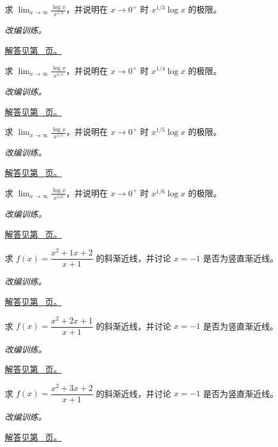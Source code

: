 \documentclass[12pt,fontset=fandol]{ctexart}
\begin{document}
\begin{example}[对数增长慢于正幂]\label{ex:c4q15}
求 $\displaystyle\lim_{x\to\infty}\frac{\log x}{x^{1/3}}$，并说明在 $x\to0^+$ 时 $x^{1/3}\log x$ 的极限。
\par\textit{改编训练。}\par\hyperref[ans:c4q15]{解答见第~\pageref{ans:c4q15} 页。}
\end{example}
\begin{example}[对数增长慢于正幂]\label{ex:c4q16}
求 $\displaystyle\lim_{x\to\infty}\frac{\log x}{x^{1/4}}$，并说明在 $x\to0^+$ 时 $x^{1/4}\log x$ 的极限。
\par\textit{改编训练。}\par\hyperref[ans:c4q16]{解答见第~\pageref{ans:c4q16} 页。}
\end{example}
\begin{example}[对数增长慢于正幂]\label{ex:c4q17}
求 $\displaystyle\lim_{x\to\infty}\frac{\log x}{x^{1/5}}$，并说明在 $x\to0^+$ 时 $x^{1/5}\log x$ 的极限。
\par\textit{改编训练。}\par\hyperref[ans:c4q17]{解答见第~\pageref{ans:c4q17} 页。}
\end{example}
\begin{example}[对数增长慢于正幂]\label{ex:c4q18}
求 $\displaystyle\lim_{x\to\infty}\frac{\log x}{x^{1/6}}$，并说明在 $x\to0^+$ 时 $x^{1/6}\log x$ 的极限。
\par\textit{改编训练。}\par\hyperref[ans:c4q18]{解答见第~\pageref{ans:c4q18} 页。}
\end{example}
\begin{example}[多项式除法求渐近线]\label{ex:c4q19}
求 $f(x)=\dfrac{x^2+1x+2}{x+1}$ 的斜渐近线，并讨论 $x=-1$ 是否为竖直渐近线。
\par\textit{改编训练。}\par\hyperref[ans:c4q19]{解答见第~\pageref{ans:c4q19} 页。}
\end{example}
\begin{example}[多项式除法求渐近线]\label{ex:c4q20}
求 $f(x)=\dfrac{x^2+2x+1}{x+1}$ 的斜渐近线，并讨论 $x=-1$ 是否为竖直渐近线。
\par\textit{改编训练。}\par\hyperref[ans:c4q20]{解答见第~\pageref{ans:c4q20} 页。}
\end{example}
\begin{example}[多项式除法求渐近线]\label{ex:c4q21}
求 $f(x)=\dfrac{x^2+3x+2}{x+1}$ 的斜渐近线，并讨论 $x=-1$ 是否为竖直渐近线。
\par\textit{改编训练。}\par\hyperref[ans:c4q21]{解答见第~\pageref{ans:c4q21} 页。}
\end{example}
\end{document}
